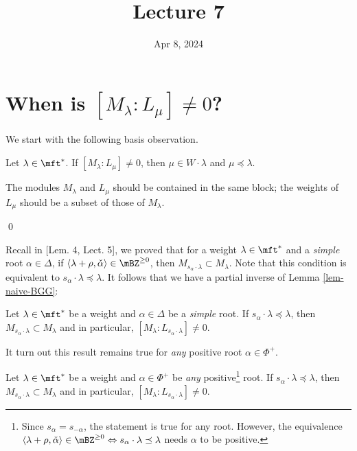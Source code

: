 





\title{Lecture 7}

\date{Apr 8, 2024}

\maketitle

\section{When is \texorpdfstring{$[M_\lambda:L_\mu]\neq0$}{[M:L] nonzero}?}

We start with the following basis observation.

\begin{lem}
	\label{lem-naive-BGG}
	Let $\lambda\in \mft^*$. If $[M_\lambda:L_\mu]\neq0$, then $\mu\in W\cdot \lambda$ and $\mu\preceq \lambda$.
\end{lem}

\proof
	The modules $M_\lambda$ and $L_\mu$ should be contained in the same block; the weights of $L_\mu$ should be a subset of those of $M_\lambda$.

\qed

	Recall in [Lem. 4, Lect. 5], we proved that for a weight $\lambda\in \mft^*$ and a \emph{simple} root $\alpha\in \Delta$, if $\langle \lambda+\rho,\check \alpha\rangle \in \mBZ^{\ge 0}$, then $M_{s_\alpha\cdot \lambda} \subset M_\lambda$. Note that this condition is equivalent to $s_\alpha \cdot \lambda \preceq \lambda$. It follows that we have a partial inverse of Lemma \ref{lem-naive-BGG}:

\begin{lem}
	\label{lem-Verma-weak}
	Let $\lambda\in \mft^*$ be a weight and $\alpha\in \Delta$ be a \emph{simple} root. If $s_\alpha \cdot \lambda \preceq \lambda$, then $M_{s_\alpha\cdot \lambda} \subset M_\lambda$ and in particular, $[M_{\lambda}:L_{s_\alpha\cdot \lambda}] \neq 0$.
\end{lem}

It turn out this result remains true for \emph{any} positive root $\alpha\in \Phi^+$.

\begin{thm}[Verma]
	\label{thm-Verma}
	Let $\lambda\in \mft^*$ be a weight and $\alpha\in \Phi^+$ be \emph{any} positive\footnote{Since $s_\alpha=s_{-\alpha}$, the statement is true for any root. However, the equivalence $\langle \lambda+\rho,\check \alpha\rangle \in \mBZ^{\ge 0} \Leftrightarrow s_\alpha \cdot \lambda \preceq \lambda$ needs $\alpha$ to be positive.} root. If $s_\alpha \cdot \lambda \preceq \lambda$, then $M_{s_\alpha\cdot \lambda} \subset M_\lambda$ and in particular, $[M_{\lambda}:L_{s_\alpha\cdot \lambda}] \neq 0$.
\end{thm}

